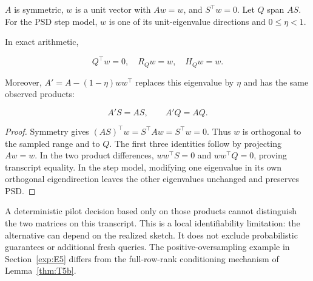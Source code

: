 \begin{proposition}\label{thm:T6}
$A$ is symmetric, $w$ is a unit vector with $Aw=w$, and $S^\top w=0$. Let $Q$ span $AS$. For the PSD step model, $w$ is one of its unit-eigenvalue directions and $0\le\eta<1$.


In exact arithmetic,


\begin{equation}
Q^\top w=0,\quad R_Qw=w,\quad H_Qw=w.
\end{equation}


Moreover, $A'=A-(1-\eta)ww^\top$ replaces this eigenvalue by $\eta$ and has the same observed products:


\begin{equation}
A'S=AS,\qquad A'Q=AQ.
\end{equation}


\end{proposition}
\begin{proof}
Symmetry gives $(AS)^\top w=S^\top Aw=S^\top w=0$. Thus $w$ is orthogonal to the sampled range and to $Q$. The first three identities follow by projecting $Aw=w$. In the two product differences, $ww^\top S=0$ and $ww^\top Q=0$, proving transcript equality. In the step model, modifying one eigenvalue in its own orthogonal eigendirection leaves the other eigenvalues unchanged and preserves PSD.

\end{proof}


A deterministic pilot decision based only on those products cannot distinguish the two matrices on this transcript. This is a local identifiability limitation: the alternative can depend on the realized sketch. It does not exclude probabilistic guarantees or additional fresh queries. The positive-oversampling example in Section~\ref{exp:E5} differs from the full-row-rank conditioning mechanism of Lemma~\ref{thm:T5b}.
